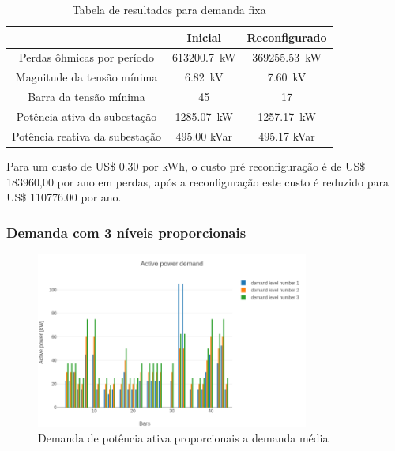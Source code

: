 \begin{table}[H]
    \centering
    \caption{Tabela de resultados para demanda fixa}
    \begin{tabular}{|c|c|c|}
    \hline
                                   & Inicial              & Reconfigurado               \\\hline
    Perdas ôhmicas por período       & \SI{613200.7}{\kilo\watt}      & \SI{369255.53}{\kilo\watt}  \\\hline
    Magnitude da tensão mínima     & \SI{6.82}{\kilo\volt}    & \SI{7.60}{\kilo\volt}   \\\hline
    Barra da tensão mínima         & 45                       & 17                      \\\hline
    Potência ativa da subestação   & \SI{1285.07}{\kilo\watt} & \SI{1257.17}{\kilo\watt}\\\hline
    Potência reativa da subestação & 495.00 kVar              & 495.17 kVar      \\\hline
    \end{tabular}
    \label{tab:resultsfixdemand}
\end{table}

Para um custo de US\$ 0.30 por kWh, o custo pré reconfiguração é de US\$ 183960,00 por ano em perdas, após a reconfiguração este custo é reduzido para US\$ 110776.00 por ano.

\subsubsection{Demanda com 3 níveis proporcionais}

\begin{figure}[H]
    \centering
    \includegraphics[width=0.8\textwidth]{7_Results/img/45demand_active.png}
    \caption{Demanda de potência ativa proporcionais a demanda média}
    \label{fig:45demandactive_propor}
\end{figure}

